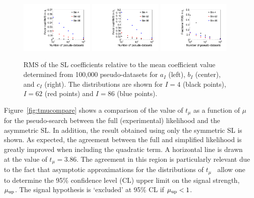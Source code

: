 \documentclass[11pt]{article}
\begin{document}
\begin{figure}[t]
  \centering
  \includegraphics[width=0.32\textwidth]{figures/varAll_A}
  \includegraphics[width=0.32\textwidth]{figures/varAll_B}
  \includegraphics[width=0.32\textwidth]{figures/varAll_C}
  \caption{RMS of the SL coefficients relative to the mean
    coefficient value determined from 100,000 pseudo-datasets for $a_{I}$
    (left), $b_{I}$ (center), and $c_{I}$ (right). The distributions are shown
    for $I=4$ (black points), $I=62$ (red points) and $I=86$ (blue points).}
  \label{fig:SLConvergence}
\end{figure}



Figure~\ref{fig:tmucompare} shows a comparison of the value of $t_{\mu}$ as a function of $\mu$ for the pseudo-search between the full (experimental)
likelihood and the asymmetric SL. In addition, the result obtained using only the symmetric SL is shown. As expected, the
agreement between the full and simplified likelihood is greatly improved when including the quadratic term. A horizontal line is drawn at the value of
$t_{\mu}= 3.86$. The agreement in this region is particularly relevant due to the fact that asymptotic approximations for the distributions of $t_{\mu}$~\cite{Cowan:2010js} allow one to determine the 95\% confidence level (CL) upper limit on the signal strength, $\mu_{\rm{up}}$.
The signal hypothesis is `excluded' at 95\% CL if $\mu_{\rm{up}} < 1$.
\end{document}

